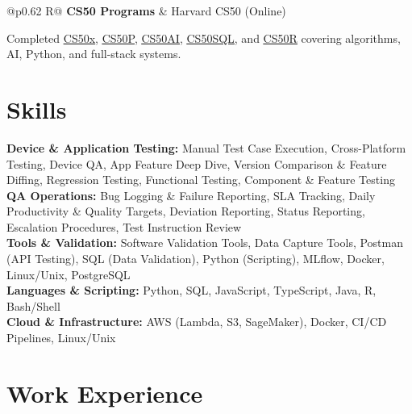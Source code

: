 \documentclass[a4paper,10pt]{article}
\newcommand{\ulink}[2]{\href{#1}{\uline{#2}}}
\newcommand{\subheading}[1]{{\color[HTML]{0A0A0A}\fontsize{12}{14}\selectfont\bfseries #1}}
\newcommand{\meta}[1]{{\color[HTML]{5C5C5C}\fontsize{10.5}{12.5}\selectfont #1}}
\begin{document}
\begin{tabularx}{\linewidth}{@{}p{0.62\linewidth} R@{}}
\subheading{CS50 Programs} & \meta{Harvard CS50 (Online)}
\end{tabularx}
\vspace{1pt}
{\color[HTML]{3A3A3A}\fontsize{11}{14}\selectfont Completed \ulink{https://cs50.harvard.edu/certificates/b14b78df-e05c-413e-a607-1dd27303053a}{CS50x}, \ulink{https://cs50.harvard.edu/certificates/32477052-9db4-49c4-a5a4-d7e58429ca2c}{CS50P}, \ulink{https://cs50.harvard.edu/certificates/9cdb4d4a-1250-4f8e-9fd7-191864e0f919}{CS50AI}, \ulink{https://cs50.harvard.edu/certificates/bc486f24-f085-4e61-8536-80940b97a1b9}{CS50SQL}, and \ulink{https://cs50.harvard.edu/certificates/666838e6-a053-4d82-b179-a60fe745fd84}{CS50R} covering algorithms, AI, Python, and full-stack systems.}

\vspace{2pt}

\section{Skills}
\vspace{5pt}
{\color[HTML]{0A0A0A}\fontsize{11}{14}\selectfont
\textbf{Device \& Application Testing:} Manual Test Case Execution, Cross-Platform Testing, Device QA, App Feature Deep Dive, Version Comparison \& Feature Diffing, Regression Testing, Functional Testing, Component \& Feature Testing \\[2pt]
\textbf{QA Operations:} Bug Logging \& Failure Reporting, SLA Tracking, Daily Productivity \& Quality Targets, Deviation Reporting, Status Reporting, Escalation Procedures, Test Instruction Review \\[2pt]
\textbf{Tools \& Validation:} Software Validation Tools, Data Capture Tools, Postman (API Testing), SQL (Data Validation), Python (Scripting), MLflow, Docker, Linux/Unix, PostgreSQL \\[2pt]
\textbf{Languages \& Scripting:} Python, SQL, JavaScript, TypeScript, Java, R, Bash/Shell \\[2pt]
\textbf{Cloud \& Infrastructure:} AWS (Lambda, S3, SageMaker), Docker, CI/CD Pipelines, Linux/Unix}

\vspace{2pt}

\section{Work Experience}
\vspace{2pt}
\end{document}
